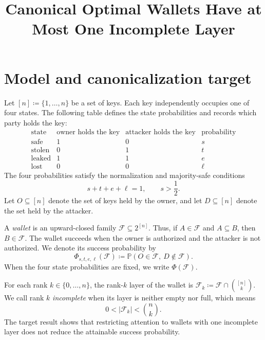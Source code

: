 \documentclass[11pt]{article}
\title{Canonical Optimal Wallets Have at Most One Incomplete Layer}
\author{}
\date{}
\newcommand{\Prob}{\ensuremath{\mathbb P}\xspace}
\newcommand{\cF}{\ensuremath{\mathcal F}\xspace}
\begin{document}
\maketitle

  \section{Model and canonicalization target}

Let ${[n]\coloneqq\{1,\ldots,n\}}$ be a set of keys.
Each key independently occupies one of four states.
The following table defines the state probabilities and records which party holds the key:
\begin{equation*}
\begin{array}{c|c|c|c}
\text{state} & \text{owner holds the key} & \text{attacker holds the key} & \text{probability}\\
\hline
\text{safe} & 1 & 0 & s\\
\text{stolen} & 0 & 1 & t\\
\text{leaked} & 1 & 1 & e\\
\text{lost} & 0 & 0 & \ell
\end{array}
\end{equation*}
The four probabilities satisfy the normalization and majority-safe conditions
\begin{equation}
s+t+e+\ell=1,
\qquad
s>\frac12.
\label{eq:parameters}
\end{equation}
Let $O\subseteq[n]$ denote the set of keys held by the owner, and let $D\subseteq[n]$ denote the set held by the attacker.

A \emph{wallet} is an upward-closed family $\cF\subseteq2^{[n]}$.
Thus, if ${A\in\cF}$ and ${A\subseteq B}$, then ${B\in\cF}$.
The wallet succeeds when the owner is authorized and the attacker is not authorized.
We denote its success probability by
\begin{equation}
\Phi_{s,t,e,\ell}(\cF)
\coloneqq
\Prob(O\in\cF,\ D\notin\cF).
\label{eq:success-probability}
\end{equation}
When the four state probabilities are fixed, we write $\Phi(\cF)$.

For each rank ${k\in\{0,\ldots,n\}}$, the rank-$k$ layer of the wallet is ${\cF_k\coloneqq\cF\cap\binom{[n]}k}$.
We call rank $k$ \emph{incomplete} when its layer is neither empty nor full, which means
\begin{equation*}
0<|\cF_k|<\binom nk.
\end{equation*}
The target result shows that restricting attention to wallets with one incomplete layer does not reduce the attainable success probability.
\end{document}
